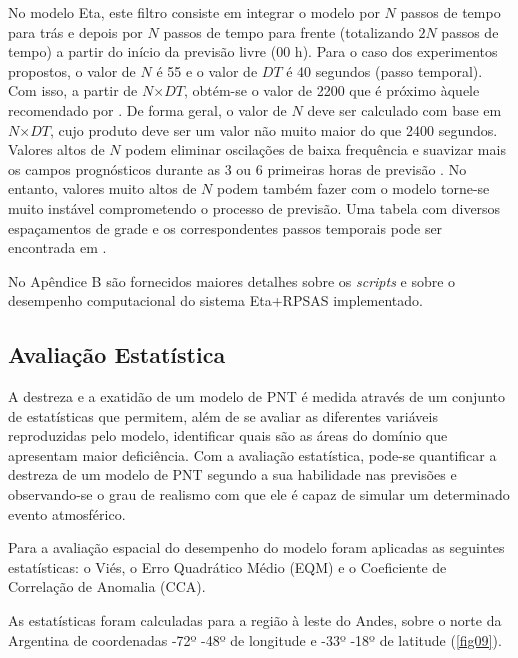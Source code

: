 No modelo Eta, este filtro consiste em integrar o modelo por $N$ passos de tempo para trás e depois por $N$ passos de tempo para frente (totalizando $2N$ passos de tempo) a partir do início da previsão livre (00 h). Para o caso dos experimentos propostos, o valor de $N$ é 55 e o valor de $DT$ é 40 segundos (passo temporal). Com isso, a partir de $N$$\times$$DT$, obtém-se o valor de 2200 que é próximo àquele recomendado por . De forma geral, o valor de $N$ deve ser calculado com base em $N$$\times$$DT$, cujo produto deve ser um valor não muito maior do que 2400 segundos. Valores altos de $N$ podem eliminar oscilações de baixa frequência e suavizar mais os campos prognósticos durante as 3 ou 6 primeiras horas de previsão \cite{pyle02}. No entanto, valores muito altos de $N$ podem também fazer com o modelo torne-se muito instável comprometendo o processo de previsão. Uma tabela com diversos espaçamentos de grade e os correspondentes passos temporais pode ser encontrada em .

No Apêndice B são fornecidos maiores detalhes sobre os \textit{scripts} e sobre o desempenho computacional do sistema Eta+RPSAS implementado.

\subsection{Avaliação Estatística}
    
A destreza e a exatidão de um modelo de PNT é medida através de um conjunto de estatísticas que permitem, além de se avaliar as diferentes variáveis reproduzidas pelo modelo, identificar quais são as áreas do domínio que apresentam maior deficiência. Com a avaliação estatística, pode-se quantificar a destreza de um modelo de PNT segundo a sua habilidade nas previsões e observando-se o grau de realismo com que ele é capaz de simular um determinado evento atmosférico.
    
Para a avaliação espacial do desempenho do modelo foram aplicadas as seguintes estatísticas: o Viés, o Erro Quadrático Médio (EQM) e o Coeficiente de Correlação de Anomalia (CCA).

As estatísticas foram calculadas para a região à leste do Andes, sobre o norte da Argentina de coordenadas -72º -48º de longitude e -33º -18º de latitude (\autoref{fig09}).

